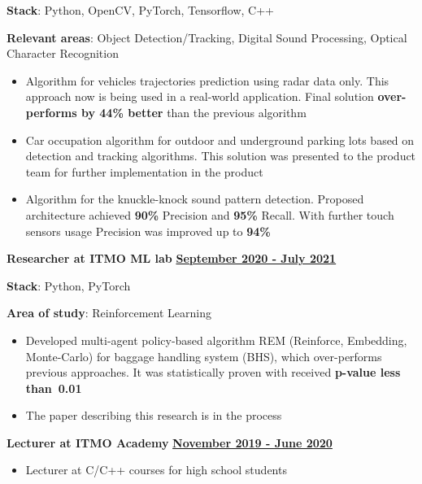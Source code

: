 \documentclass[11pt,a4paper]{report}
\begin{document}
\vspace{5px}
\textbf{Stack}: Python, OpenCV, PyTorch, Tensorflow, C++

\vspace{5px}
\textbf{Relevant areas}: Object Detection/Tracking, Digital Sound Processing, Optical Character Recognition


\begin{itemize}[label={}, left=10pt]
    \item Algorithm for vehicles trajectories prediction using radar data only. This approach now is being used in a real-world application. Final solution \textbf{over-performs by 44\% better} than the previous algorithm

    \item Car occupation algorithm for outdoor and underground parking lots based on detection and tracking algorithms. This solution was presented to the product team for further implementation in the product

    \item Algorithm for the knuckle-knock sound pattern detection. Proposed architecture achieved \textbf{90\%} Precision and \textbf{95\%} Recall. With further touch sensors usage Precision was improved up to \textbf{94\%}
\end{itemize}


\textbf{\large{Researcher at ITMO ML lab}}
\hfill
\textbf {\underline{September 2020 - July 2021}}

\vspace{5px}
\textbf{Stack}: Python, PyTorch

\vspace{5px}
\textbf{Area of study}: Reinforcement Learning

\begin{itemize}[label={}, left=10pt]
    \item Developed multi-agent policy-based algorithm REM (Reinforce, Embedding, Monte-Carlo) for baggage handling system (BHS), which over-performs previous approaches. It was statistically proven with received \textbf{p-value less than~0.01}
    \item The paper describing this research is in the process
\end{itemize}


\textbf{\large{Lecturer at ITMO Academy}}
\hfill
\textbf{\underline{November 2019 - June 2020}}
\begin{itemize}[label={}, left=10pt]
    \item Lecturer at C/C++ courses for high school students
\end{itemize}
\end{document}
